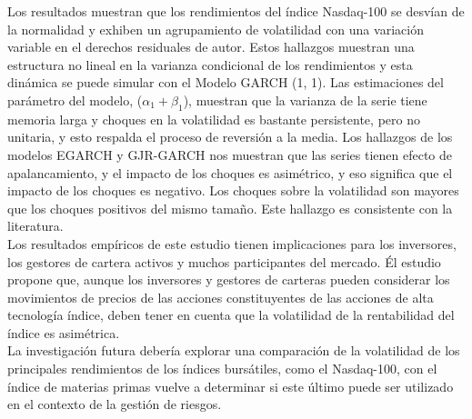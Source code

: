 \begin{itemize}
	  Los resultados muestran que los rendimientos del índice Nasdaq-100 se desvían de la normalidad y exhiben un agrupamiento de volatilidad con una variación variable en el derechos residuales de autor. Estos hallazgos muestran una estructura no lineal en la varianza condicional de los rendimientos y esta dinámica se puede simular con el Modelo GARCH (1, 1). 
	  Las estimaciones del parámetro del modelo, ($\alpha_1+\beta_1$), muestran que la varianza de la serie tiene memoria larga y choques en la volatilidad es bastante persistente, pero no unitaria, y esto respalda el proceso de reversión a la media. 
	  Los hallazgos de los modelos EGARCH y GJR-GARCH nos muestran que las series tienen efecto de apalancamiento, y el impacto de los choques es asimétrico, y eso significa que el impacto de los choques es negativo. Los choques sobre la volatilidad son mayores que los choques positivos del mismo tamaño. Este hallazgo es consistente con la literatura. \\
	  Los resultados empíricos de este estudio tienen implicaciones para los inversores, los gestores de cartera activos y muchos participantes del mercado. 
	  Él estudio propone que, aunque los inversores y gestores de carteras pueden considerar los movimientos de precios de las acciones constituyentes de las acciones de alta tecnología índice, deben tener en cuenta que la volatilidad de la rentabilidad del índice es asimétrica.\\
	  La investigación futura debería explorar una comparación de la volatilidad de los principales rendimientos de los índices bursátiles, como el Nasdaq-100, con el índice de materias primas vuelve a determinar si este último puede ser utilizado en el contexto de la gestión de riesgos.

\end{itemize}
